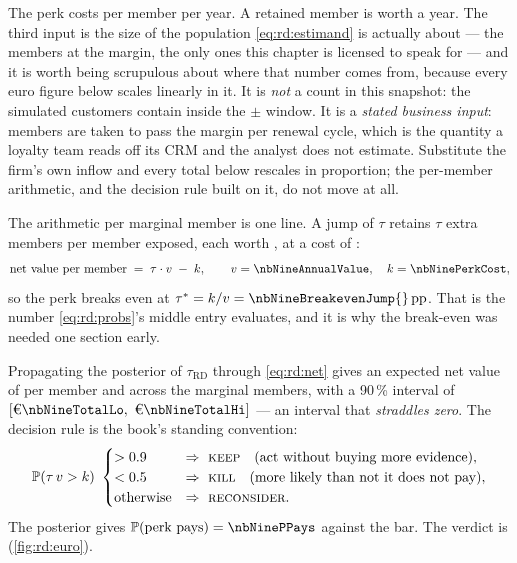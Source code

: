 The perk costs \eur{\nbNinePerkCost} per member per year. A retained member is worth
\eur{\nbNineAnnualValue} a year. The third input is the size of the population
\cref{eq:rd:estimand} is actually about --- the members at the \eur{\nbNineCutoff} margin, the only
ones this chapter is licensed to speak for --- and it is worth being scrupulous about where that
number comes from, because every euro figure below scales linearly in it. It is \emph{not} a count
in this snapshot: the \nbNineN{} simulated customers contain \nbNineNWindow{} inside the
$\pm$\eur{\nbNineH} window. It is a \emph{stated business input}: \nbNineNMargin{} members are
taken to pass the \eur{\nbNineCutoff} margin per renewal cycle, which is the quantity a loyalty
team reads off its CRM and the analyst does not estimate. Substitute the firm's own inflow and
every total below rescales in proportion; the per-member arithmetic, and the decision rule built on
it, do not move at all.

The arithmetic per marginal member is one line. A jump of $\tau$ retains $\tau$ extra members per
member exposed, each worth \eur{\nbNineAnnualValue}, at a cost of \eur{\nbNinePerkCost}:
%
\begin{equation}
  \text{net value per member} \;=\; \tau \cdot v \;-\; k ,
  \qquad v = \nbNineAnnualValue, \quad k = \nbNinePerkCost ,
  \label{eq:rd:net}
\end{equation}
%
so the perk breaks even at $\tau^{\ast} = k / v = \nbNineBreakevenJump{}\,\text{pp}$. That is the
number \cref{eq:rd:probs}'s middle entry evaluates, and it is why the break-even was needed one
section early.

Propagating the posterior of $\tau_{\mathrm{RD}}$ through \cref{eq:rd:net} gives an expected net
value of \eur{\nbNineNetMember} per member and \eur{\nbNineTotalNet} across the \nbNineNMargin{}
marginal members, with a 90\,\% interval of $[\eur{\nbNineTotalLo},\ \eur{\nbNineTotalHi}]$ --- an
interval that \emph{straddles zero}. The decision rule is the book's standing convention:
%
\begin{equation}
  \operatorname{\mathbb{P}}(\tau\, v > k)\ \begin{cases}
    > 0.9 & \Rightarrow\ \textsc{keep} \quad\text{(act without buying more evidence)},\\
    < 0.5 & \Rightarrow\ \textsc{kill} \quad\text{(more likely than not it does not pay)},\\
    \text{otherwise} & \Rightarrow\ \textsc{reconsider}.
  \end{cases}
  \label{eq:rd:rule}
\end{equation}
%
The posterior gives $\Prob(\text{perk pays}) = \nbNinePPays$ against the \nbNineActionBar{} bar. The
verdict is \textbf{\nbNineDecision} (\cref{fig:rd:euro}).

